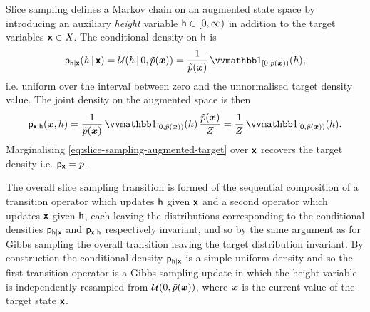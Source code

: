 Slice sampling defines a Markov chain on an augmented state space by introducing an auxiliary \emph{height} variable $\mathsf{h} \in [0, \infty)$ in addition to the target variables $\boldsymbol{\mathsf{x}} \in \mathit{X}$. The conditional density on $\mathsf{h}$ is 
\begin{equation}
  \pden{\rvar{h}|\rvct{x}}(h\gvn\rvct{x}) = 
  \mathcal{U}\lpa h\gvn 0, \utgtdens(\vct{x})\rpa = 
  \frac{1}{\utgtdens(\vct{x})} \ind{[0,\utgtdens(\vct{x}))}(h),
\end{equation}
i.e. uniform over the interval between zero and the unnormalised target density value. The joint density on the augmented space is then
\begin{equation}\label{eq:slice-sampling-augmented-target}
  \pden{\rvct{x},\rvar{h}}(\vct{x},h) = 
  \frac{1}{\utgtdens(\vct{x})} \ind{[0,\utgtdens(\vct{x}))}(h)\, \frac{\utgtdens(\vct{x})}{Z} =
  \frac{1}{Z} \ind{[0,\utgtdens(\vct{x}))}(h).
\end{equation}
Marginalising \eqref{eq:slice-sampling-augmented-target} over $\boldsymbol{\mathsf{x}}$ recovers the target density i.e. $\mathsf{p}_{\boldsymbol{\mathsf{x}}} = p$. %

The overall slice sampling transition is formed of the sequential composition of a transition operator which updates $\mathsf{h}$ given $\boldsymbol{\mathsf{x}}$ and a second operator which updates $\boldsymbol{\mathsf{x}}$ given $\mathsf{h}$, each leaving the distributions corresponding to the conditional densities $\mathsf{p}_{\mathsf{h}|\boldsymbol{\mathsf{x}}}$ and $\mathsf{p}_{\boldsymbol{\mathsf{x}}|\mathsf{h}}$ respectively invariant, and so by the same argument as for Gibbs sampling the overall transition leaving the target distribution invariant. By construction the conditional density $\mathsf{p}_{\mathsf{h}|\boldsymbol{\mathsf{x}}}$ is a simple uniform density and so the first transition operator is a Gibbs sampling update in which the height variable is independently resampled from $\mathcal{U}\lpa 0, \utgtdens(\vct{x})\rpa$, where $\boldsymbol{x}$ is the current value of the target state $\boldsymbol{\mathsf{x}}$.


